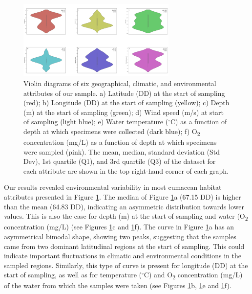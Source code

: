 \begin{figure}[htbp]
    \centering
    \includegraphics[width=0.7\textwidth]{figure1.jpg}
    \caption{Violin diagrams of six geographical, climatic, and environmental attributes of our sample. a) Latitude (DD) at the start of sampling (red); b) Longitude (DD) at the start of sampling (yellow); c) Depth (m) at the start of sampling (green); d) Wind speed (m/s) at start of sampling (light blue); e) Water temperature ($^\circ$C) as a function of depth at which specimens were collected (dark blue); f) O\textsubscript{2} concentration (mg/L) as a function of depth at which specimens were sampled (pink). The mean, median, standard deviation (Std Dev), 1st quartile (Q1), and 3rd quartile (Q3) of the dataset for each attribute are shown in the top right-hand corner of each graph. \label{fig:fig2}}
\end{figure}

Our results revealed environmental variability in most cumacean habitat attributes presented in Figure \ref{fig:fig2}. The median of Figure \ref{fig:fig2}a (67.15 DD) is higher than the mean (64.83 DD), indicating an asymmetric distribution towards lower values. This is also the case for depth (m) at the start of sampling and water (O\textsubscript{2} concentration (mg/L) (see Figures \ref{fig:fig2}c and \ref{fig:fig2}f). The curve in Figure \ref{fig:fig2}a has an asymmetrical bimodal shape, showing two peaks, suggesting that the samples came from two dominant latitudinal regions at the start of sampling. This could indicate important fluctuations in climatic and environmental conditions in the sampled regions. Similarly, this type of curve is present for longitude (DD) at the start of sampling, as well as for temperature ($^\circ$C) and O\textsubscript{2} concentration (mg/L) of the water from which the samples were taken (see Figures \ref{fig:fig2}b, \ref{fig:fig2}e and \ref{fig:fig2}f). 

